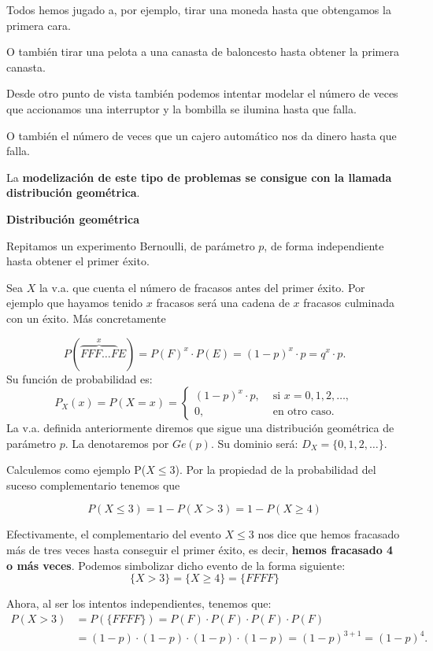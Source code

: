 \documentclass[]{book}
\begin{document}
Todos hemos jugado a, por ejemplo, tirar una moneda hasta que obtengamos la primera cara.

O también tirar una pelota a una canasta de baloncesto hasta obtener la primera canasta.

Desde otro punto de vista también podemos intentar modelar el número de veces que accionamos una interruptor y la bombilla se ilumina hasta que falla.

O también el número de veces que un cajero automático nos da dinero hasta que falla.

La \textbf{modelización de este tipo de problemas se consigue con la llamada distribución geométrica}.

 \textbf{Distribución geométrica}

Repitamos un experimento Bernoulli, de parámetro \(p\), de forma independiente hasta obtener el primer éxito.

Sea \(X\) la v.a. que cuenta el número de fracasos antes del primer éxito. Por ejemplo que hayamos tenido \(x\) fracasos será una cadena de \(x\) fracasos culminada con un éxito. Más concretamente

\[P(\overbrace{FFF\ldots F}^{x}E)=P(F)^{x}\cdot P(E)=(1-p)^{x}\cdot p=q^{x}\cdot p.\]
Su función de probabilidad es:
\[
P_X(x)=P(X=x)=\left\{\begin{array}{ll}
(1-p)^{x}\cdot p, & \mbox{ si } x=0,1,2,\ldots,\\
0, &\mbox{ en otro caso.}
\end{array}\right.
\]
La v.a. definida anteriormente diremos que sigue una distribución geométrica de parámetro \(p\). La denotaremos por \(Ge(p)\).
Su dominio será: \(D_X=\{0,1,2,\ldots\}\).

Calculemos como ejemplo P(\(X\leq 3\)).
Por la propiedad de la probabilidad del suceso complementario tenemos que

\[
P(X\leq 3 )=1-P(X> 3)=1-P(X\geq 4)
\]

Efectivamente, el complementario del evento \(X\leq 3\) nos dice que hemos fracasado más de tres veces hasta conseguir el primer éxito, es decir, \textbf{hemos fracasado 4 o más veces}. Podemos simbolizar dicho evento de la forma siguiente:
\[
\{X>3\}=\{X\geq 4\}= \{FFFF\}
\]

Ahora, al ser los intentos independientes, tenemos que:
\[
\begin{array}{ll}
P(X>3) & =  P(\{FFFF\})= P(F)\cdot P(F)\cdot P(F)\cdot P(F)\\
&= (1-p)\cdot (1-p)\cdot (1-p)\cdot (1-p)= (1-p)^{3+1}=(1-p)^{4}.
\end{array}
\]
\end{document}
